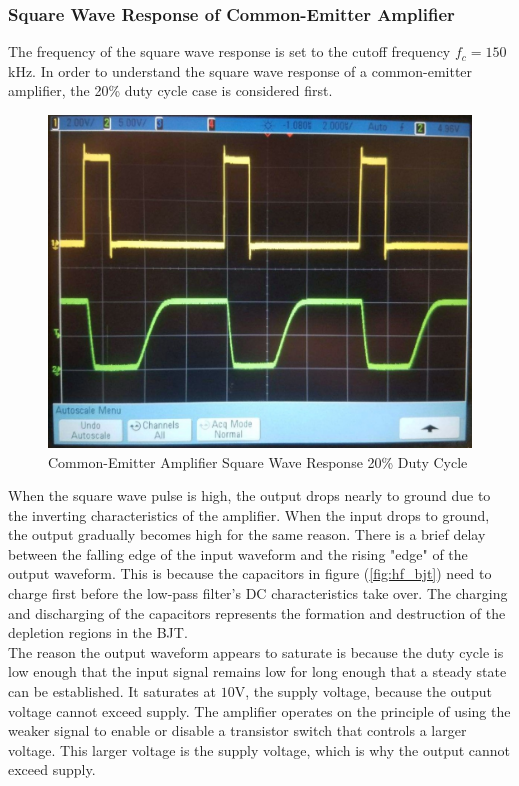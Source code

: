 \subsubsection{Square Wave Response of Common-Emitter Amplifier}
The frequency of the square wave response is set to the cutoff frequency $f_c = 150$\si{\kilo\hertz}. In order to understand the square wave response of a common-emitter amplifier, the 20\% duty cycle case is considered first.
\FloatBarrier
\begin{figure}[h!]
	\centering
	\includegraphics[scale=0.25]{../images/amplifier_20_duty_cycle.jpeg}
	\caption{Common-Emitter Amplifier Square Wave Response 20\% Duty Cycle}
	\label{fig:twenty_perc_duty_cycle}
\end{figure}
\FloatBarrier
When the square wave pulse is high, the output drops nearly to ground due to the inverting characteristics of the amplifier. When the input drops to ground, the output gradually becomes high for the same reason. There is a brief delay between the falling edge of the input waveform and the rising "edge" of the output waveform. This is because the capacitors in figure (\ref{fig:hf_bjt}) need to charge first before the low-pass filter's DC characteristics take over. The charging and discharging of the capacitors represents the formation and destruction of the depletion regions in the BJT. \\
The reason the output waveform appears to saturate is because the duty cycle is low enough that the input signal remains low for long enough that a steady state can be established. It saturates at $10$\si{\volt}, the supply voltage, because the output voltage cannot exceed supply. The amplifier operates on the principle of using the weaker signal to enable or disable a transistor switch that controls a larger voltage. This larger voltage is the supply voltage, which is why the output cannot exceed supply. \\
